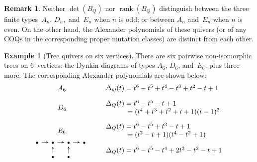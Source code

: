 \documentclass[11pt, letterpaper]{amsart}
\theoremstyle{definition}
\newtheorem{remark}[theorem]{Remark}
\newtheorem{example}[theorem]{Example}
\numberwithin{equation}{section}
\begin{document}
\begin{remark}
Neither $\det(B_Q)$ nor $\operatorname{rank}(B_Q)$ 
distinguish between the three finite types~$A_n$, $D_n$,~and~$E_n$ when $n$ is odd;
or between $A_n$ and~$E_n$ when $n$ is even.
On the other hand, the Alexander polynomials of these quivers (or of any COQs in the corresponding
proper mutation classes) are distinct from each other. 
\end{remark}

\pagebreak[3]

\begin{example}[Tree quivers on six vertices]
\label{eg:6vert-Alexander}
There are six pairwise non-isomorphic trees on 6~vertices: 
the Dynkin diagrams of types $A_6$, $D_6$, and~$E_6$, plus three more. 
The corresponding Alexander polynomials are shown below: 
\begin{equation*}
\begin{array}{ll}
\hspace{.5in} A_6 & \begin{array}{l} \Delta_Q(t)=t^6 - t^5 + t^4 - t^3 + t^2 - t + 1 \end{array}
\\[10pt]
\hspace{.5in} D_6 & \begin{array}{l} \Delta_Q(t)=t^6 - t^5  - t + 1 \\
\hspace{31pt} = (t^4 + t^3 + t^2 + t + 1)(t-1)^2 \end{array}
\\[15pt]
\hspace{.5in} E_6 & \begin{array}{l} \Delta_Q(t)=t^6 - t^5 +t^3 - t + 1 \\
\hspace{31pt} =(t^2 - t + 1) (t^4 - t^2 + 1) \end{array}
\\[5pt]
\begin{tikzcd}[arrows={-stealth}, sep=1em]
  \scriptstyle\bullet  \arrow[r]   & \scriptstyle\bullet  \arrow[r] & \scriptstyle\bullet \arrow[r] & \scriptstyle\bullet \\
 & \scriptstyle\bullet  \arrow[u] &  \scriptstyle\bullet \arrow[u]
   & 
\end{tikzcd}
\quad & \begin{array}{l} \ \\[-5pt]
\Delta_Q(t)=t^6 - t^5 - t^4 + 2t^3 - t^2 - t + 1

\end{array}
\end{array}
\end{equation*}
\end{example}
\end{document}
